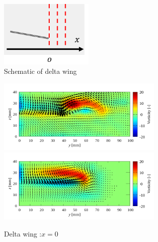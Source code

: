 \documentclass[twocolumn,a4j]{jsarticle}
\begin{document}
\begin{figure}[htbp]
  \centering
  \includegraphics[keepaspectratio, width=45mm]{../images/measurement_plane_for_Delta_wingpng.png}
  \caption{Schematic of delta wing}
\end{figure}

\begin{figure}[htbp]
  \centering
  {
    \includegraphics[keepaspectratio, width=80mm]{../images/Simulation/Compare/experiment_x=0.png}
    \includegraphics[keepaspectratio, width=80mm]{../images/Simulation/Compare/simulation_x=0.png}
  }
  \caption{Delta wing :$x=0$}
\end{figure}
\end{document}
